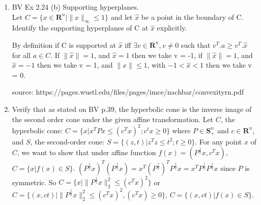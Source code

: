 \documentclass[10pt]{article}
\newcommand{\0}{\mat{0}}
\newcommand{\SP}{\mathbf{S}_{+}^n}
\begin{document}
\begin{enumerate}

\item BV Ex 2.24 (b)  Supporting hyperplanes.\\
Let $C=\{x \in \mathbf{R}^{n} | \| x \|_{\infty} \le 1\}$ and let $\hat{x}$ be a point in the boundary of C. Identify the supporting hyperplanes of C at $\hat{x}$ explicitly.

By definition if C is supported at $\hat{x}$ iff $\exists v \in \mathbf{R}^{n}, v \neq 0$ such that $v^T. a \ge v ^T. \hat{x}$ for all $a \in C$. 
If $ \|\hat{x}\| = 1$, and $\hat{x} =1$ then we take v = -1, 
if $ \|\hat{x}\| = 1$, and $\hat{x} =-1$ then we take v = 1, and $ \|\hat{x}\| \le 1$, with  $-1 < \hat{x}  <1$ then we take v = 0.

source:  https://pages.wustl.edu/files/pages/imce/nachbar/convexityrn.pdf

\item Verify that as stated on BV p.39, the hyperbolic cone is the inverse image of the second order cone under the given affine transformation. 
Let $C$, the hyperbolic cone: $C=\{x | x^T P x \le (c^T x)^2; c^t x \ge 0 \}$ where $P \in \SP$ and $c \in \mathbf{R}^{n}$, and 
$S$, the second-order cone: $S=\{ (z,t) | z^T z \le t^2; t \ge 0 \}$.
For any point $x$ of $C$, we want to show that under affine function $f(x) = (P^{\frac{1}{2}} x, c^T x)$, $C = \{x | f(x) \in S \}$.
$(P^{\frac{1}{2}} x)^T (P^{\frac{1}{2}} x) = x^T (P^{\frac{1}{2}})^T P^{\frac{1}{2}} x = x^T P^{\frac{1}{2}} P^{\frac{1}{2}} x$ since $P$ is symmetric.
So $C = \{x | \| P^{\frac{1}{2}} x \|_2^2 \le (c^T x)^2 \}$ or $C = \{(x, ct) | \| P^{\frac{1}{2}} x \|_2^2 \le (c^T x)^2,  (c^T x) \ge 0\}$, $C = \{(x, ct) | f(x) \in S \}$.
\end{enumerate}
\end{document}
